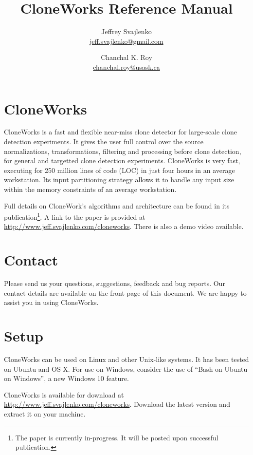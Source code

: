 \documentclass[]{article}
\begin{document}
	\title{CloneWorks Reference Manual}
	\author{Jeffrey Svajlenko \\ \href{mailto:jeff.svajlenko@gmail.com}{jeff.svajlenko@gmail.com} \and Chanchal K. Roy \\ \href{mailto:chanchal.roy@usask.ca}{chanchal.roy@usask.ca}}
	\maketitle
	\newpage
	
	\tableofcontents
	\newpage
	

\section{CloneWorks}
	CloneWorks is a fast and flexible near-miss clone detector for large-scale clone detection experiments.  It gives the user full control over the source normalizations, transformations, filtering and processing before clone detection, for general and targetted clone detection experiments.  CloneWorks is very fast, executing for 250 million lines of code (LOC) in just four hours in an average workstation.  Its input partitioning strategy allows it to handle any input size within the memory constraints of an average workstation.
	
	Full details on CloneWork's algorithms and architecture can be found in its publication\footnote{The paper is currently in-progress.  It will be posted upon successful publication.}.  A link to the paper is provided at \url{http://www.jeff.svajlenko.com/cloneworks}.  There is also a demo video available.
	
	
\section{Contact}
	Please send us your questions, suggestions, feedback and bug reports.  Our contact details are available on the front page of this document.  We are happy to assist you in using CloneWorks.
	
\section{Setup}	
	CloneWorks can be used on Linux and other Unix-like systems.  It has been tested on Ubuntu and OS X.  For use on Windows, consider the use of ``Bash on Ubuntu on Windows'', a new Windows 10 feature.
	
	CloneWorks is available for download at \url{http://www.jeff.svajlenko.com/cloneworks}.  Download the latest version and extract it on your machine.
	
\end{document}
